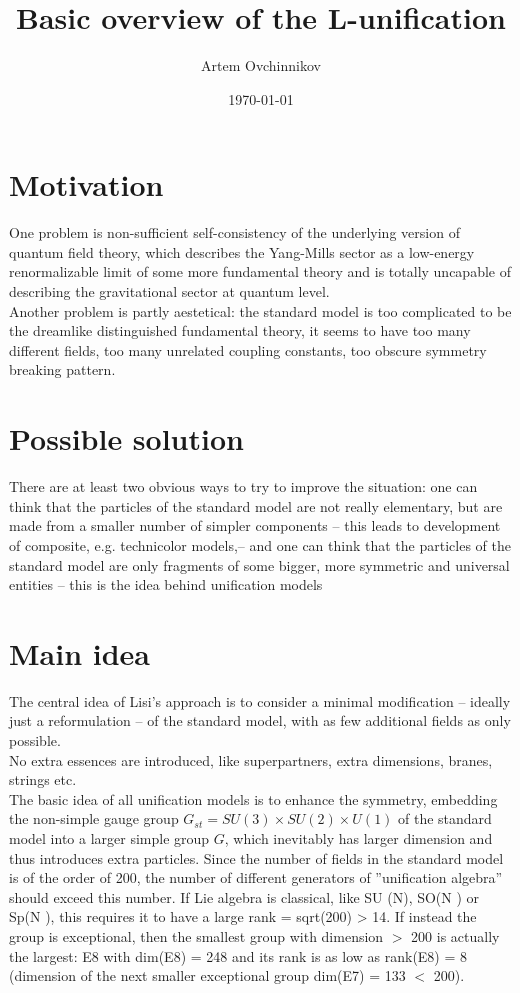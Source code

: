 \documentclass{article}
\title{Basic overview of the L-unification}
\author{Artem Ovchinnikov}
\date{\today}
\begin{document}
\maketitle

\tableofcontents


\section{Motivation}
One problem is non-sufficient self-consistency of the underlying version of quantum field theory, which describes the Yang-Mills sector as a low-energy renormalizable limit of some more fundamental theory and is totally uncapable of describing the gravitational sector at quantum level. \\
Another problem is partly aestetical: the standard model is too complicated to be the dreamlike distinguished fundamental theory, it seems to have too many different fields, too many unrelated coupling constants, too obscure symmetry breaking pattern. \\

\section{Possible solution}
There are at least two obvious ways to try to improve the situation: one can think that the particles of the standard model are not really elementary, but are made from a smaller number of simpler components – this leads to development of composite, e.g. technicolor models,– and one can think that the particles of the standard model are only fragments of some bigger, more symmetric and universal entities – this is the idea behind unification models

\section{Main idea}
The central idea of Lisi’s approach is to consider a minimal modification – ideally just a reformulation – of the standard model, with as few additional fields as only possible. \\
No extra essences are introduced, like superpartners, extra dimensions, branes, strings etc. \\
The basic idea of all unification models is to enhance the symmetry, embedding the non-simple gauge group $ G_{st} = SU (3) \times SU (2) \times U (1) $ of the standard model into a larger simple group $G$, which inevitably has larger dimension and thus introduces extra particles.
Since the number of fields in the standard model is of the order of 200, the number of different generators of ”unification algebra” should exceed this number. If Lie algebra is classical, like SU (N), SO(N ) or Sp(N ), this requires it to have a large rank = sqrt(200) > 14. If instead the group is exceptional, then the smallest group with dimension $>$ 200 is actually the largest: E8 with dim(E8) = 248 and its rank is as low as rank(E8) = 8 (dimension of the next smaller exceptional group dim(E7) = 133 $<$ 200).
\end{document}
